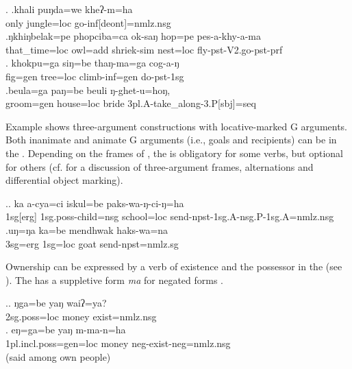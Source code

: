 	 \ex. \ag.khali puŋda=we  kheʔ-m=ha\\
	only jungle{\sc =loc} go-{\sc inf[deont]=nmlz.nsg}		\\
	  
\bg.ŋkhiŋbelak=pe   phopciba=ca        ok-saŋ          hop=pe     pes-a-khy-a-ma\\
that\_time{\sc =loc} owl{\sc =add} shriek{\sc -sim} nest{\sc =loc} fly{\sc [3sg]-pst-V2.go-pst-prf}\\
	 
	\bg. khokpu=ga      siŋ=be    thaŋ-ma=ga       cog-a-ŋ\\
fig{\sc =gen} tree{\sc =loc} climb{\sc -inf=gen} do{\sc -pst-1sg}\\
	 
	\bg.beula=ga    paŋ=be     beuli ŋ-ghet-u=hoŋ, \\
	groom{\sc =gen} house{\sc =loc} bride {\sc 3pl.A-}take\_along{\sc -3.P[sbj]=seq}\\


Example \Next shows three-argument constructions with locative-marked G arguments. Both inanimate and animate G arguments  (i.e., goals and recipients) can be in the . Depending on the frames of , the  is obligatory for some verbs, but optional for others (cf.  for a discussion of three-argument frames, alternations and differential object marking).
 
\ex.\ag. ka a-cya=ci iskul=be paks-wa-ŋ-ci-ŋ=ha \\
	{\sc 1sg[erg]} {\sc 1sg.poss}-child{\sc =nsg} school{\sc =loc} send-{\sc npst-1sg.A-nsg.P-1sg.A=nmlz.nsg}	\\
	\bg.uŋ=ŋa ka=be mendhwak haks-wa=na\\
	{\sc 3sg=erg} {\sc 1sg=loc} goat send{\sc [3sg.A;3.P]-npst=nmlz.sg}\\

Ownership can be expressed by a verb of existence and the possessor in the  (see \Next). The  has a suppletive form \emph{ma} for negated forms \Next[b]. 

\ex.\ag. ŋga=be yaŋ waiʔ=ya?\\
{\sc 2sg.poss=loc} money exist{\sc [3sg;npst]=nmlz.nsg}\\
\bg. eŋ=ga=be yaŋ m-ma-n=ha\\
		{\sc 1pl.incl.poss=gen=loc} money {\sc neg-}exist{\sc [3;npst]-neg=nmlz.nsg}	\\
	 (said among own people)

